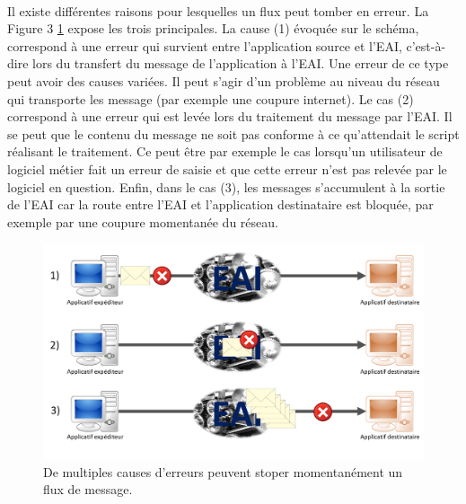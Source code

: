 			\paragraph{}%
			Il existe différentes raisons pour lesquelles un flux peut tomber en erreur.
			La Figure 3 \ref{Figure 3} expose les trois principales. La cause (1) évoquée
			sur le schéma, correspond à une erreur qui survient entre l'application source et l'EAI,
			c'est-à-dire lors du transfert du message de l'application à l'EAI. Une
			erreur de ce type peut avoir des causes variées. Il peut s'agir d'un problème
			au niveau du réseau qui transporte les message (par exemple une coupure
			internet). Le cas (2) correspond à une erreur qui est levée
			lors du traitement du message par l'EAI. Il se peut que le contenu du
			message ne soit pas conforme à ce qu'attendait le script réalisant le
			traitement. Ce peut être par exemple le cas lorsqu'un utilisateur de
			logiciel métier fait un erreur de saisie et que cette erreur n'est pas
			relevée par le logiciel en question. Enfin, dans le cas (3), les messages
			s'accumulent à la sortie de l'EAI car la route entre l'EAI et l'application
			destinataire est bloquée, par exemple par une coupure momentanée du réseau.
			\begin{figure}[!h]
				\centering
				\includegraphics[width=15cm]{../img/error_1.png}
				\caption{\label{Figure 3} De multiples causes d'erreurs peuvent stoper
				momentanément un flux de message.}
			\end{figure}
			
